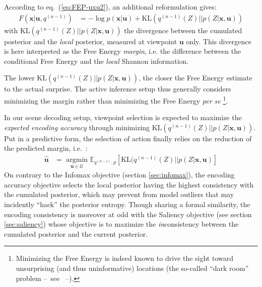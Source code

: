 \documentclass[12pt,twoside,openright]{article}
\begin{document}
According to eq.~(\ref{eq:FEP-uxu2}), an additional reformulation gives:
\begin{align}
F(\boldsymbol{x}|\boldsymbol{u}, q^{(n-1)}) &= -\log p(\boldsymbol{x}|\boldsymbol{u}) + \text{KL}(q^{(n-1)}(Z)||p(Z|\boldsymbol{x}, \boldsymbol{u}))
\end{align}
with $\text{KL}(q^{(n-1)}(Z)||p(Z|\boldsymbol{x}, \boldsymbol{u}))$ the divergence between the cumulated posterior and the \emph{local} posterior, measured at viewpoint $\boldsymbol{u}$ only. This divergence is here interpreted as the Free Energy \emph{margin}, i.e. the difference between the conditional Free Energy and 
the \emph{local} Shannon information.

The lower $\text{KL}(q^{(n-1)}(Z)||p(Z|\boldsymbol{x}, \boldsymbol{u}))$, the closer the Free Energy estimate to the actual surprise. The active inference setup thus generally considers minimizing the margin rather than minimizing the Free Energy \emph{per se} 
\footnote{Minimizing the Free Energy is indeed known to drive the sight toward unsurprising (and thus uninformative) locations (the so-called ``dark room'' problem --~see \cite{friston2012perceptions}~--).}.

In our scene decoding setup, viewpoint selection is expected to maximize the \emph{expected encoding accuracy} through minimizing $\text{KL}(q^{(n-1)}(Z)||p(Z|\boldsymbol{x}, \boldsymbol{u}))$.
Put in a predictive form, the selection of action finally relies on the reduction of the predicted margin, i.e.~:
\begin{align}
 \hat{\boldsymbol{u}} &= \underset{\boldsymbol{u} \in \mathcal{U}}{\text{ argmin }} \mathbb{E}_{q^{(n-1)}, p}\left[\text{KL}(q^{(n-1)}(Z)||p(Z|\boldsymbol{x}, \boldsymbol{u})\right]
\end{align}
On contrary to the Infomax objective (section \ref{sec:infomax}), the encoding accuracy objective selects the local posterior having the highest consistency with the cumulated posterior, which may prevent from model outliers that may incidently ``hack'' the posterior entropy.
Though sharing a formal similarity, the encoding consistency is moreover at odd with the Saliency objective (see section \ref{sec:saliency}) whose objective is to maximize the \emph{in}consistency between the cumulated posterior and the current posterior.
\end{document}

